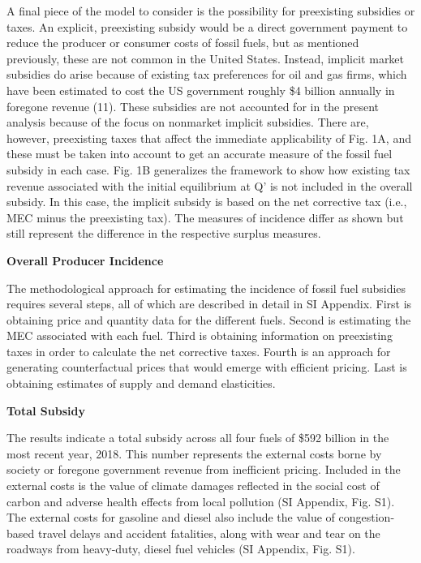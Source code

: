 \documentclass[
]{book}
\begin{document}
A final piece of the model to consider is the possibility for preexisting subsidies or taxes. An explicit, preexisting subsidy would be a direct government payment to reduce the producer or consumer costs of fossil fuels, but as mentioned previously, these are not common in the United States. Instead, implicit market subsidies do arise because of existing tax preferences for oil and gas firms, which have been estimated to cost the US government roughly \$4 billion annually in foregone revenue (11). These subsidies are not accounted for in the present analysis because of the focus on nonmarket implicit subsidies. There are, however, preexisting taxes that affect the immediate applicability of Fig. 1A, and these must be taken into account to get an accurate measure of the fossil fuel subsidy in each case. Fig. 1B generalizes the framework to show how existing tax revenue associated with the initial equilibrium at Q' is not included in the overall subsidy. In this case, the implicit subsidy is based on the net corrective tax (i.e., MEC minus the preexisting tax). The measures of incidence differ as shown but still represent the difference in the respective surplus measures.

\textbf{Overall Producer Incidence}

The methodological approach for estimating the incidence of fossil fuel subsidies requires several steps, all of which are described in detail in SI Appendix. First is obtaining price and quantity data for the different fuels. Second is estimating the MEC associated with each fuel. Third is obtaining information on preexisting taxes in order to calculate the net corrective taxes. Fourth is an approach for generating counterfactual prices that would emerge with efficient pricing. Last is obtaining estimates of supply and demand elasticities.

\textbf{Total Subsidy}

The results indicate a total subsidy across all four fuels of \$592 billion in the most recent year, 2018. This number represents the external costs borne by society or foregone government revenue from inefficient pricing. Included in the external costs is the value of climate damages reflected in the social cost of carbon and adverse health effects from local pollution (SI Appendix, Fig. S1). The external costs for gasoline and diesel also include the value of congestion-based travel delays and accident fatalities, along with wear and tear on the roadways from heavy-duty, diesel fuel vehicles (SI Appendix, Fig. S1).
\end{document}
